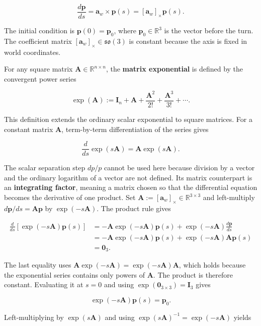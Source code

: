 \documentclass[
  australian,
  12pt,
  letterpaper,
  DIV=11,
  numbers=noendperiod,
  twoside]{scrreprt}
\begin{document}
\[
\frac{d\mathbf p}{ds}
=
\mathbf a_w\times\mathbf p(s)
=
[\mathbf a_w]_\times\mathbf p(s).
\]

The initial condition is \(\mathbf p(0)=\mathbf p_0\), where
\(\mathbf p_0\in\mathbb R^3\) is the vector before the turn. The
coefficient matrix \([\mathbf a_w]_\times\in\mathfrak{so}(3)\) is
constant because the axis is fixed in world coordinates.

For any square matrix \(\mathbf A\in\mathbb R^{n\times n}\), the
\textbf{matrix exponential} is defined by the convergent power series

\[
\boxed{
\exp(\mathbf A)
\mathrel{:=}
\mathbf I_n
+
\mathbf A
+
\frac{\mathbf A^2}{2!}
+
\frac{\mathbf A^3}{3!}
+
\cdots
}.
\]

This definition extends the ordinary scalar exponential to square
matrices. For a constant matrix \(\mathbf A\), term-by-term
differentiation of the series gives

\[
\frac{d}{ds}\exp(s\mathbf A)
=
\mathbf A\exp(s\mathbf A).
\]

The scalar separation step \(d p/p\) cannot be used here because
division by a vector and the ordinary logarithm of a vector are not
defined. Its matrix counterpart is an \textbf{integrating factor},
meaning a matrix chosen so that the differential equation becomes the
derivative of one product. Set
\(\mathbf A\mathrel{:=}[\mathbf a_w]_\times\in\mathbb R^{3\times3}\) and
left-multiply \(d\mathbf p/ds=\mathbf A\mathbf p\) by
\(\exp(-s\mathbf A)\). The product rule gives

\[
\begin{aligned}
\frac{d}{ds}
\left[
\exp(-s\mathbf A)\mathbf p(s)
\right]
&=
-\mathbf A\exp(-s\mathbf A)\mathbf p(s)
+
\exp(-s\mathbf A)\frac{d\mathbf p}{ds}\\
&=
-\mathbf A\exp(-s\mathbf A)\mathbf p(s)
+
\exp(-s\mathbf A)\mathbf A\mathbf p(s)\\
&=
\mathbf 0_3.
\end{aligned}
\]

The last equality uses
\(\mathbf A\exp(-s\mathbf A)=\exp(-s\mathbf A)\mathbf A\), which holds
because the exponential series contains only powers of \(\mathbf A\).
The product is therefore constant. Evaluating it at \(s=0\) and using
\(\exp(\mathbf 0_{3\times3})=\mathbf I_3\) gives

\[
\exp(-s\mathbf A)\mathbf p(s)
=
\mathbf p_0.
\]

Left-multiplying by \(\exp(s\mathbf A)\) and using
\(\exp(s\mathbf A)^{-1}=\exp(-s\mathbf A)\) yields
\end{document}
